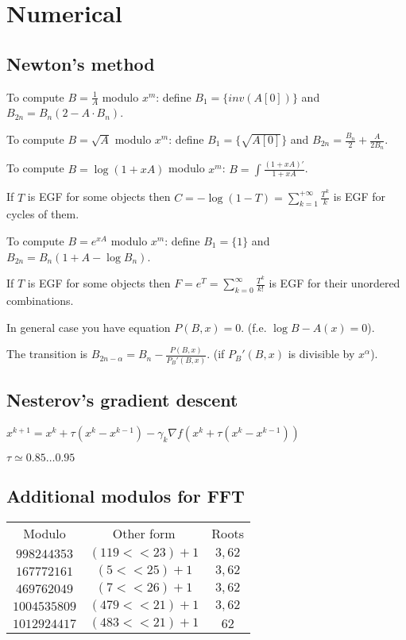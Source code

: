 \chapter{Numerical}
\section{Newton's method}
	To compute $B = \frac{1}{A}$ modulo $x^m$: define $B_1 = \{inv(A[0])\}$ and $B_{2n} = B_n (2 - A \cdot B_n)$.


	To compute $B = \sqrt{A}$ modulo $x^m$: define $B_1 = \{\sqrt{A[0]}\}$ and $B_{2n} = \frac{B_n}{2} + \frac{A}{2B_n}$.


	To compute $B = \log (1 + xA)$ modulo $x^m$: $B = \int\frac{(1 + xA)'}{1 + xA}$.

	If $T$ is EGF for some objects then $C = -\log (1 - T) = \sum_{k = 1}^{+\infty} \frac{T^k}{k}$ is EGF for cycles of them.


	To compute $B = e^{xA}$ modulo $x^m$: define $B_1 = \{1\}$ and $B_{2n} = B_n(1 + A - \log B_n)$.

	If $T$ is EGF for some objects then $F = e^T = \sum_{k = 0}^{\infty} \frac{T^k}{k!}$ is EGF for their unordered combinations.

	In general case you have equation $P(B, x) = 0$. (f.e. $\log B - A(x) = 0$).

	The transition is $B_{2n - \alpha} = B_n - \frac{P(B, x)}{P_B'(B, x)}$. (if $P_B'(B, x)$ is divisible by $x^\alpha$).
\section{Nesterov's gradient descent}
	$x^{k + 1} = x^k + \tau(x^k - x^{k - 1}) - \gamma_k \nabla f(x^k + \tau(x^k - x^{k - 1}))$

	$\tau \simeq 0.85 \ldots 0.95$
\section{Additional modulos for FFT}
\begin{center}
	\begin{tabular}{ c | c | c }
		Modulo & Other form & Roots \\
		$998244353$ & $(119 << 23) + 1$ & $3, 62$ \\
		$167772161$ & $(5 << 25) + 1$ & $3, 62$ \\
		$469762049$ & $(7 << 26) + 1$ & $3, 62$ \\
		$1004535809$ & $(479 << 21) + 1$ & $3, 62$ \\
		$1012924417$ & $(483 << 21) + 1$ & $62$ \\

	\end{tabular}
\end{center}

